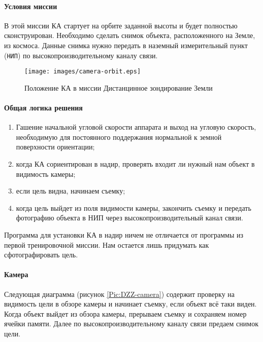 \documentclass[12pt,a4paper]{article}
\begin{document}
\paragraph{Условия миссии} В этой миссии КА стартует на орбите
заданной высоты и будет полностью сконструирован. Необходимо сделать снимок объекта, расположенного на Земле, из космоса. Данные снимка нужно передать в наземный измерительный пункт (\verb'НИП') по высокопроизводительному каналу связи.

\begin{figure}[tbh]
  \begin{center}
    \texttt{[image: images/camera-orbit.eps]}
    \caption{Положение КА в миссии Дистанцинное зондирование Земли}
    \label{Pic:Camera-DZZ}
  \end{center}
\end{figure}

\paragraph{Общая логика решения} 

\begin{enumerate}
\item Гашение начальной угловой скорости аппарата и выход на угловую скорость, необходимую для постоянного поддержания нормальной к земной поверхности ориентации;
\item когда КА сориентирован в надир, проверять входит ли нужный нам объект в видимость камеры;
\item если цель видна, начинаем съемку;
\item когда цель выйдет из поля видимости камеры, закончить съемку и передать фотографию объекта в НИП через высокопроизводительный канал связи.
\end{enumerate}

Программа для установки КА в надир ничем не отличается от программы из первой тренировочной миссии. Нам остается лишь придумать как сфотографировать цель.

\paragraph{Камера} Следующая диаграмма (рисунок \ref{Pic:DZZ-camera}) содержит проверку на видимость цели в обзоре камеры и начинает съемку, если объект всё таки виден. Когда объект выйдет из обзора камеры, прерываем съемку и сохраняем номер ячейки памяти. Далее по высокопроизводительному каналу связи предаем снимок цели.
\end{document}
